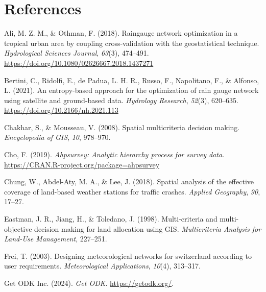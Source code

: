 \documentclass[spanish]{article}
\newlength{\cslhangindent}
\newlength{\cslentryspacingunit} %
\newenvironment{CSLReferences}[2] %
 {%
  \setlength{\parindent}{0pt}
  \ifodd #1
  \let\oldpar\par
  \def\par{\hangindent=\cslhangindent\oldpar}
  \fi
  \setlength{\parskip}{#2\cslentryspacingunit}
 }%
 {}
\begin{document}
\hypertarget{references}{%
\section*{References}\label{references}}

\hypertarget{refs}{}
\begin{CSLReferences}{1}{0}
\leavevmode{}%
Ali, M. Z. M., \& Othman, F. (2018). Raingauge network optimization in a
tropical urban area by coupling cross-validation with the geostatistical
technique. \emph{Hydrological Sciences Journal}, \emph{63}(3), 474--491.
\url{https://doi.org/10.1080/02626667.2018.1437271}

\leavevmode{}%
Bertini, C., Ridolfi, E., de Padua, L. H. R., Russo, F., Napolitano, F.,
\& Alfonso, L. (2021). An entropy-based approach for the optimization of
rain gauge network using satellite and ground-based data.
\emph{Hydrology Research}, \emph{52}(3), 620--635.
\url{https://doi.org/10.2166/nh.2021.113}

\leavevmode{}%
Chakhar, S., \& Mousseau, V. (2008). Spatial multicriteria decision
making. \emph{Encyclopedia of GIS}, \emph{10}, 978--970.

\leavevmode{}%
Cho, F. (2019). \emph{Ahpsurvey: Analytic hierarchy process for survey
data}. \url{https://CRAN.R-project.org/package=ahpsurvey}

\leavevmode{}%
Chung, W., Abdel-Aty, M. A., \& Lee, J. (2018). Spatial analysis of the
effective coverage of land-based weather stations for traffic crashes.
\emph{Applied Geography}, \emph{90}, 17--27.

\leavevmode{}%
Eastman, J. R., Jiang, H., \& Toledano, J. (1998). Multi-criteria and
multi-objective decision making for land allocation using GIS.
\emph{Multicriteria Analysis for Land-Use Management}, 227--251.

\leavevmode{}%
Frei, T. (2003). Designing meteorological networks for switzerland
according to user requirements. \emph{Meteorological Applications},
\emph{10}(4), 313--317.

\leavevmode{}%
Get ODK Inc. (2024). \emph{Get ODK}. \url{https://getodk.org/}.


\end{CSLReferences}
\end{document}
